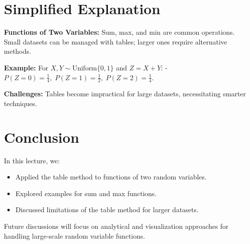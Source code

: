 \documentclass{article}
\begin{document}
\section*{Simplified Explanation}

\textbf{Functions of Two Variables:}
Sum, max, and min are common operations. Small datasets can be managed with tables; larger ones require alternative methods.

\textbf{Example:}
For $X, Y \sim \text{Uniform}\{0, 1\}$ and $Z = X + Y$:
- $P(Z = 0) = \frac{1}{4}, \; P(Z = 1) = \frac{1}{2}, \; P(Z = 2) = \frac{1}{4}$.

\textbf{Challenges:}
Tables become impractical for large datasets, necessitating smarter techniques.

\section*{Conclusion}

In this lecture, we:
\begin{itemize}
  \item Applied the table method to functions of two random variables.
  \item Explored examples for sum and max functions.
  \item Discussed limitations of the table method for larger datasets.
\end{itemize}

Future discussions will focus on analytical and visualization approaches for handling large-scale random variable functions.
\end{document}

